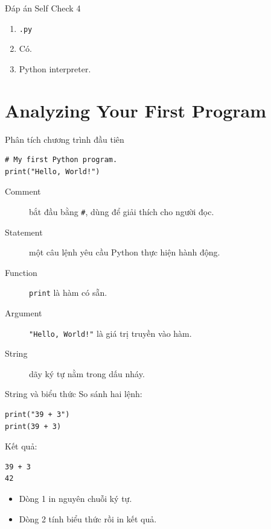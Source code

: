 \documentclass[aspectratio=169,10pt]{beamer}
\begin{document}
\begin{frame}{Đáp án Self Check 4}
\begin{enumerate}
  \item \texttt{.py}
  \item Có.
  \item Python interpreter.
\end{enumerate}
\end{frame}

\section{Analyzing Your First Program}

\begin{frame}[fragile]{Phân tích chương trình đầu tiên}
\begin{lstlisting}
# My first Python program.
print("Hello, World!")
\end{lstlisting}

\begin{description}
  \item[Comment] bắt đầu bằng \texttt{\#}, dùng để giải thích cho người đọc.
  \item[Statement] một câu lệnh yêu cầu Python thực hiện hành động.
  \item[Function] \texttt{print} là hàm có sẵn.
  \item[Argument] \texttt{"Hello, World!"} là giá trị truyền vào hàm.
  \item[String] dãy ký tự nằm trong dấu nháy.
\end{description}
\end{frame}

\begin{frame}[fragile]{String và biểu thức}
So sánh hai lệnh:

\begin{lstlisting}
print("39 + 3")
print(39 + 3)
\end{lstlisting}

Kết quả:

\begin{lstlisting}
39 + 3
42
\end{lstlisting}

\begin{itemize}
  \item Dòng 1 in nguyên chuỗi ký tự.
  \item Dòng 2 tính biểu thức rồi in kết quả.
\end{itemize}
\end{frame}
\end{document}
